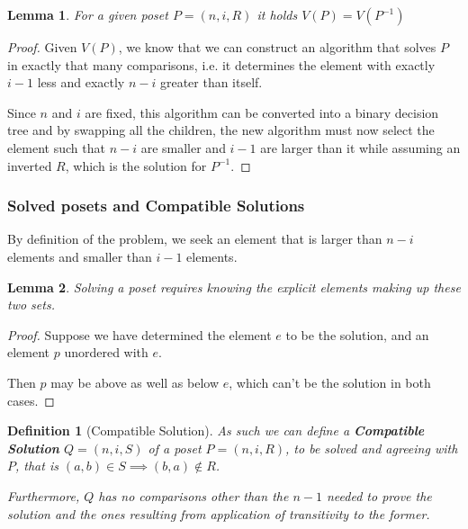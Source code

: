 \documentclass[10pt,journal,compsoc]{IEEEtran}
\newtheorem{lemma}{Lemma}
\newtheorem{definition}{Definition}
\begin{document}
\begin{lemma} \label{lemma:dual_poset_allowed}
  For a given poset $P = (n, i, R)$ it holds $V(P) = V(P^{-1})$
\end{lemma}

\begin{proof}
  Given $V(P)$, we know that we can construct an algorithm that solves $P$ in exactly that many comparisons, i.e. it determines the element with exactly $i - 1$ less and exactly $n - i$ greater than itself.

  Since $n$ and $i$ are fixed, this algorithm can be converted into a binary decision tree and by swapping all the children, the new algorithm must now select the element such that $n - i$ are smaller and $i - 1$ are larger than it while assuming an inverted $R$, which is the solution for $P^{-1}$.
\end{proof}


\subsubsection{Solved posets and Compatible Solutions}
By definition of the problem, we seek an element that is larger than $n-i$ elements and smaller than $i - 1$ elements.

\begin{lemma}\label{lemma:partition}
  Solving a poset requires knowing the explicit elements making up these two sets.
\end{lemma}

\begin{proof}
  Suppose we have determined the element $e$ to be the solution, and an element $p$ unordered with $e$.

  Then $p$ may be above as well as below $e$, which can't be the solution in both cases.
\end{proof}

\begin{definition}[Compatible Solution]
  As such we can define a \textbf{Compatible Solution} $Q = (n, i, S)$ of a poset $P = (n, i, R)$, to be solved and agreeing with $P$, that is $(a, b)\in S\implies (b, a)\notin R$.

  Furthermore, $Q$ has no comparisons other than the $n - 1$ needed to prove the solution and the ones resulting from application of transitivity to the former.
\end{definition}
\end{document}
